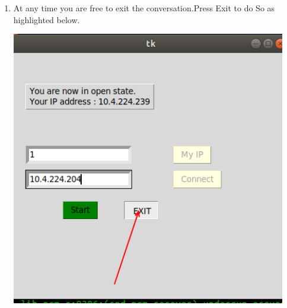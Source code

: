 \documentclass[12pt]{article}
\begin{document}
\begin{enumerate}
    \item At any time you are free to exit the conversation.Press Exit to do So as highlighted below.
    
    \bigbreak
     \includegraphics[width=120mm,scale=0.8]{8.png}
\end{enumerate}
\end{document}
